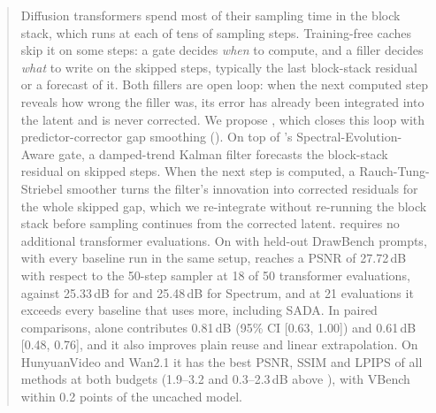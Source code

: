 \begin{abstract}
Diffusion transformers spend most of their sampling time in the block stack, which runs at each of tens of sampling
steps. Training-free caches skip it on some steps: a gate decides \emph{when} to compute, and a filler decides
\emph{what} to write on the skipped steps, typically the last block-stack residual or a forecast of it. Both fillers
are open loop: when the next computed step reveals how wrong the filler was, its error has already been integrated
into the latent and is never corrected. We propose \ours, which closes this loop with predictor-corrector gap smoothing (\pcgs).
On top of \seacache's Spectral-Evolution-Aware gate, a damped-trend Kalman filter forecasts the block-stack residual on
skipped steps. When the next step is computed, a Rauch-Tung-Striebel smoother turns the filter's innovation into corrected
residuals for the whole skipped gap, which we re-integrate without re-running the block stack before sampling continues
from the corrected latent. \pcgs requires no additional transformer evaluations. On \flux with held-out DrawBench prompts, with every baseline run in the same setup, \ours reaches a PSNR
of 27.72\,dB with respect to the 50-step sampler at 18 of 50 transformer evaluations, against 25.33\,dB for
\seacache and 25.48\,dB for Spectrum, and at 21 evaluations it exceeds every baseline that uses more, including SADA.
In paired comparisons, \pcgs alone contributes 0.81\,dB (95\% CI [0.63, 1.00]) and 0.61\,dB [0.48, 0.76], and it
also improves plain reuse and linear extrapolation.
On HunyuanVideo and Wan2.1 it has the best PSNR, SSIM and LPIPS of all methods at both budgets (1.9--3.2 and
0.3--2.3\,dB above \seacache), with VBench within 0.2 points of the uncached model.
\end{abstract}
